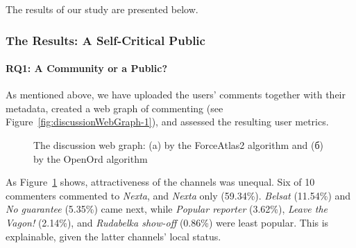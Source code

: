 The results of our study are presented below.

\subsubsection{The Results: A Self-Critical Public}

\paragraph{RQ1: A Community or a Public?}
As mentioned above, we have uploaded the users’ comments together with their metadata, created a web graph of commenting (see Figure~\cref{fig:discussionWebGraph-1}), and assessed the resulting user metrics.


\begin{figure}[ht]
	\caption[Этот текст попадает в названия рисунков в списке рисунков]{The discussion web graph: (a) by the ForceAtlas2 algorithm and (б) by the OpenOrd algorithm}\label{fig:discussionWebGraph}
\end{figure}

As Figure~\cref{fig:discussionWebGraph} shows, attractiveness of the channels was unequal. Six of 10 commenters commented to \textit{Nexta}, and \textit{Nexta} only (59.34\%). \textit{Belsat} (11.54\%) and \textit{No guarantee} (5.35\%) came next, while \textit{Popular reporter} (3.62\%), \textit{Leave the Vagon!} (2.14\%), and \textit{Rudabelka show-off} (0.86\%) were least popular. This is explainable, given the latter channels’ local status.

